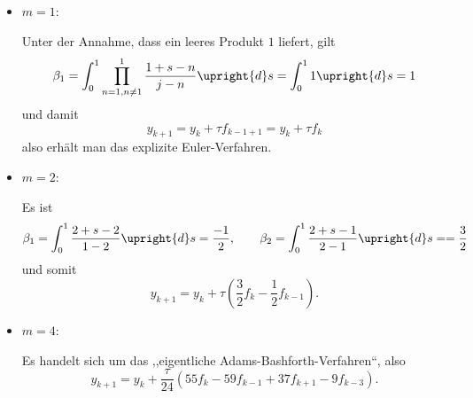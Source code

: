 \documentclass{book}
\newcommand{\tmdummy}{$\mbox{}$}
\newenvironment{itemizedot}{\begin{itemize} \renewcommand{\labelitemi}{$\bullet$}\renewcommand{\labelitemii}{$\bullet$}\renewcommand{\labelitemiii}{$\bullet$}\renewcommand{\labelitemiv}{$\bullet$}}{\end{itemize}}
\begin{document}
\begin{example*}
  {\tmdummy}
  
  \begin{itemizedot}
    \item $m = 1$:
    
    Unter der Annahme, dass ein leeres Produkt $1$ liefert, gilt
    \[ \beta_1 = \int_0^1 \prod_{n = 1, n \neq 1}^1 \frac{1 + s - n}{j - n}
       \upright{d} s = \int_0^1 1 \upright{d} s = 1 \]
    und damit
    \[ y_{k + 1} = y_k + \tau f_{k - 1 + 1} = y_k + \tau f_k \]
    also erh{\"a}lt man das explizite Euler-Verfahren.
    
    \item $m = 2$:
    
    Es ist
    \[ \beta_1 = \int_0^1 \frac{2 + s - 2}{1 - 2} \upright{d} s = \frac{-
       1}{2}, \text{\qquad} \beta_2 = \int_0^1 \frac{2 + s - 1}{2 - 1}
       \upright{d} s = = \frac{3}{2} \]
    und somit
    \[ y_{k + 1} = y_k + \tau \left( \frac{3}{2} f_k - \frac{1}{2} f_{k - 1}
       \right) . \]
    \item $m = 4$:
    
    Es handelt sich um das ,,eigentliche Adams-Bashforth-Verfahren``, also
    \[ y_{k + 1} = y_k + \frac{\tau}{24} (55 f_k - 59 f_{k - 1} + 37 f_{k + 1}
       - 9 f_{k - 3}) . \]
  \end{itemizedot}
\end{example*}
\end{document}

